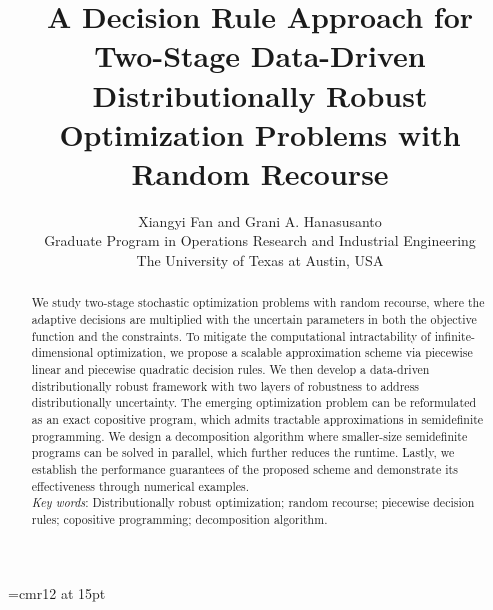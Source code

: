 \documentclass{article}
\begin{document}
%
%
%
%

\font\myfont=cmr12 at 15pt
\title{{\myfont A Decision Rule Approach for Two-Stage Data-Driven Distributionally Robust Optimization Problems with Random Recourse}}
\author{ Xiangyi Fan and Grani A. Hanasusanto\\ Graduate Program in Operations Research and Industrial Engineering\\ The University of Texas at Austin, USA}
\date{ }
\maketitle

\begin{abstract} 
We study two-stage stochastic optimization problems with random recourse, where the adaptive decisions are multiplied with the uncertain parameters in both the objective function and the constraints. To mitigate the computational intractability of infinite-dimensional optimization, we propose a scalable approximation scheme via piecewise linear and piecewise quadratic decision rules. We then develop a data-driven distributionally robust framework with two layers of robustness to address distributionally uncertainty. The emerging optimization problem can be reformulated as an exact copositive program, which admits tractable approximations in semidefinite programming. We design a decomposition algorithm where smaller-size semidefinite programs can be solved in parallel, which further reduces the runtime. Lastly, we establish the performance guarantees of the proposed scheme and demonstrate its effectiveness through numerical examples.\\
\textit{Key words}: Distributionally robust optimization; random  recourse; piecewise decision rules; copositive programming; decomposition algorithm.
\end{abstract}
\end{document}
